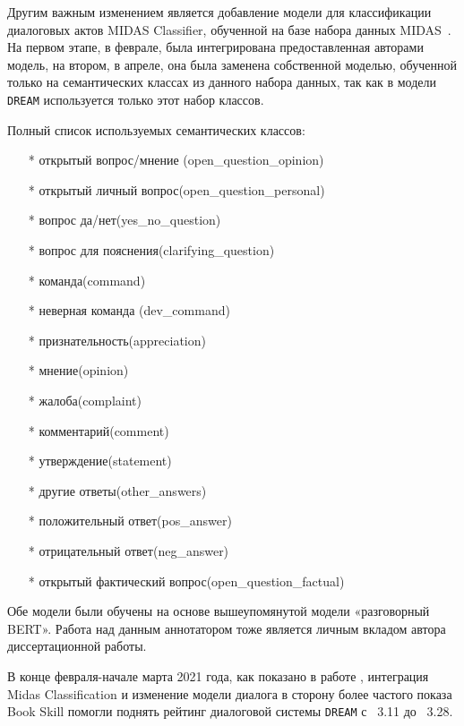 Другим важным изменением является добавление модели для классификации диалоговых актов MIDAS Classifier, обученной на базе набора данных MIDAS~\cite{midas}. На первом этапе, в феврале, была интегрирована предоставленная авторами модель, на втором, в апреле, она была заменена собственной моделью, обученной только на семантических классах из данного набора данных, так как в модели \texttt{DREAM} используется только этот набор классов.


Полный список используемых семантических классов:
\begin{itemize}
\item[*] открытый вопрос/мнение (open\_question\_opinion)
\item[*] открытый личный вопрос(open\_question\_personal)
\item[*] вопрос да/нет(yes\_no\_question)
\item[*] вопрос для пояснения(clarifying\_question)
\item[*] команда(command)
\item[*] неверная команда (dev\_command)
\item[*] признательность(appreciation)
\item[*] мнение(opinion)
\item[*] жалоба(complaint)
\item[*] комментарий(comment)
\item[*] утверждение(statement)
\item[*] другие ответы(other\_answers)
\item[*] положительный ответ(pos\_answer)
\item[*] отрицательный ответ(neg\_answer)
\item[*] открытый фактический вопрос(open\_question\_factual)
\end{itemize}
Обе модели были обучены на основе вышеупомянутой модели «разговорный BERT».  Работа над данным аннотатором тоже является личным вкладом автора диссертационной работы.

В конце февраля-начале марта 2021 года, как показано  в работе \cite{dream2}, интеграция Midas Classification и изменение модели диалога в сторону более частого показа Book Skill помогли поднять рейтинг диалоговой системы \texttt{DREAM} с ~3.11 до ~3.28.



